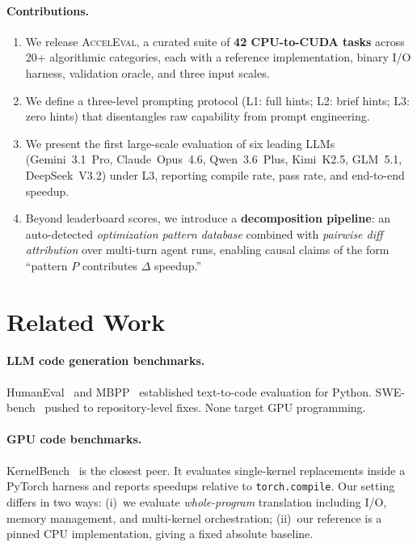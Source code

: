\documentclass{article}
\begin{document}
\paragraph{Contributions.}
\begin{enumerate}
  \item We release \textsc{AccelEval}, a curated suite of \textbf{42 CPU-to-CUDA tasks} across 20+ algorithmic categories, each with a reference implementation, binary I/O harness, validation oracle, and three input scales.
  \item We define a three-level prompting protocol (L1: full hints; L2: brief hints; L3: zero hints) that disentangles raw capability from prompt engineering.
  \item We present the first large-scale evaluation of six leading LLMs (Gemini~3.1~Pro, Claude~Opus~4.6, Qwen~3.6~Plus, Kimi~K2.5, GLM~5.1, DeepSeek~V3.2) under L3, reporting compile rate, pass rate, and end-to-end speedup.
  \item Beyond leaderboard scores, we introduce a \textbf{decomposition pipeline}: an auto-detected \emph{optimization pattern database} combined with \emph{pairwise diff attribution} over multi-turn agent runs, enabling causal claims of the form ``pattern $P$ contributes $\Delta$ speedup.''
\end{enumerate}

\section{Related Work}
\label{sec:related}

\paragraph{LLM code generation benchmarks.}
HumanEval~\citep{humaneval} and MBPP~\citep{mbpp} established text-to-code evaluation for Python. SWE-bench~\citep{swebench} pushed to repository-level fixes. None target GPU programming.

\paragraph{GPU code benchmarks.}
KernelBench~\citep{kernelbench} is the closest peer. It evaluates single-kernel replacements inside a PyTorch harness and reports speedups relative to \texttt{torch.compile}. Our setting differs in two ways: (i)~we evaluate \emph{whole-program} translation including I/O, memory management, and multi-kernel orchestration; (ii)~our reference is a pinned CPU implementation, giving a fixed absolute baseline.
\end{document}
